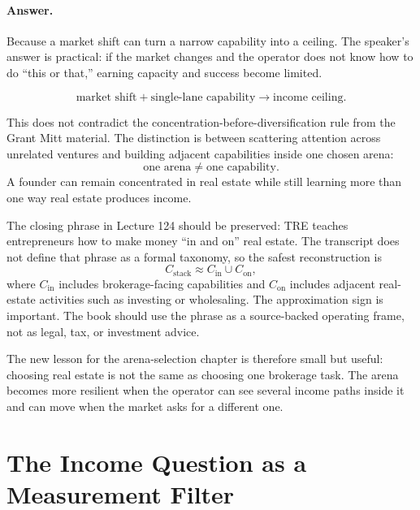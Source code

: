 \documentclass[11pt,oneside]{book}
\begin{document}
\paragraph{Answer.}
Because a market shift can turn a narrow capability into a ceiling. The speaker's answer is practical: if the market changes and the operator does not know how to do ``this or that,'' earning capacity and success become limited.

\[
\text{market shift}
+
\text{single-lane capability}
\longrightarrow
\text{income ceiling}.
\]

This does not contradict the concentration-before-diversification rule from the Grant Mitt material. The distinction is between scattering attention across unrelated ventures and building adjacent capabilities inside one chosen arena:
\[
\text{one arena}
\neq
\text{one capability}.
\]
A founder can remain concentrated in real estate while still learning more than one way real estate produces income.

The closing phrase in Lecture 124 should be preserved: TRE teaches entrepreneurs how to make money ``in and on'' real estate. The transcript does not define that phrase as a formal taxonomy, so the safest reconstruction is
\[
C_{\text{stack}}
\approx
C_{\mathrm{in}}\cup C_{\mathrm{on}},
\]
where \(C_{\mathrm{in}}\) includes brokerage-facing capabilities and \(C_{\mathrm{on}}\) includes adjacent real-estate activities such as investing or wholesaling. The approximation sign is important. The book should use the phrase as a source-backed operating frame, not as legal, tax, or investment advice.

The new lesson for the arena-selection chapter is therefore small but useful: choosing real estate is not the same as choosing one brokerage task. The arena becomes more resilient when the operator can see several income paths inside it and can move when the market asks for a different one.


\section{The Income Question as a Measurement Filter}
\end{document}
